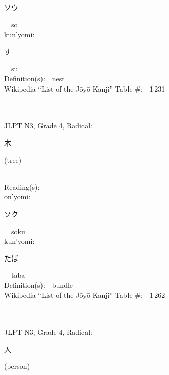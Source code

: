 \begin{multicols}{2}
{\hspace*{2em}}{\begin{CJK}{UTF8}{min} ソウ \end{CJK}}\ \ s\=o\ \ \\
{\hspace*{1em}}kun'yomi:\ \ \\
{\hspace*{2em}}{\begin{CJK}{UTF8}{min} す \end{CJK}}\ \ su\ \ \\
Definition(s):\ \ nest \\
Wikipedia ``List of the J\=oy\=o Kanji'' Table \#:\ \ 1\,231 \\
\ \ \\
{\fontsize{34pt}{40pt}  }\ \ \\  %
{JLPT N3, Grade 4, Radical:\ \ {\begin{CJK}{UTF8}{min} 木 \end{CJK}} (tree) } \\
Reading(s):\ \ \\
{\hspace*{1em}}on'yomi:\ \ \\
{\hspace*{2em}}{\begin{CJK}{UTF8}{min} ソク \end{CJK}}\ \ soku\ \ \\
{\hspace*{1em}}kun'yomi:\ \ \\
{\hspace*{2em}}{\begin{CJK}{UTF8}{min} たば \end{CJK}}\ \ taba\ \ \\
Definition(s):\ \ bundle \\
Wikipedia ``List of the J\=oy\=o Kanji'' Table \#:\ \ 1\,262 \\
\ \ \\
{\fontsize{34pt}{40pt}  }\ \ \\  %
{JLPT N3, Grade 4, Radical:\ \ {\begin{CJK}{UTF8}{min} 人 \end{CJK}} (person) } \\

\end{multicols}
